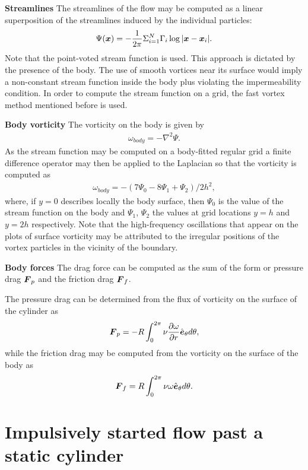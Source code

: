 {\bf Streamlines}
The streamlines of the flow may be computed as a linear superposition of the streamlines induced by the individual particles:
\begin{align}
\Psi (\boldsymbol{x}) = -\frac{1}{2\pi} \Sigma^{N}_{i=1} \Gamma_i \log |\boldsymbol{x} - \boldsymbol{x}_i|.
\end{align}
Note that the point-voted stream function is used. This approach is dictated by the presence of the body.
The use of smooth vortices near its surface would imply a non-constant stream function inside the body plus violating the impermeability condition.
In order to compute the stream function on a grid, the fast vortex method mentioned before is used.

{\bf Body vorticity}
The vorticity on the body is given by
\begin{align}
\omega_{body} = -\nabla^2 \Psi.
\end{align}
As the stream function may be computed on a body-fitted regular grid a finite difference operator may then be applied to the Laplacian so that the vorticity is computed as
\begin{align}
\omega_{body} = - (7\Psi_0 - 8\Psi_1 + \Psi_2) / 2h^2,
\end{align}
where, if $y = 0$ describes locally the body surface, then $\Psi_0$ is the value of the stream function on the body and $\Psi_1$, $\Psi_2$ the values at grid locations $y = h$ and $y = 2h$ respectively.
Note that the high-frequency oscillations that appear on the plots of surface vorticity may be attributed to the irregular positions of the vortex particles in the vicinity of the boundary.

{\bf Body forces}
The drag force can be computed as the sum of the form or pressure drag $\boldsymbol{F}_p$ and the friction drag $\boldsymbol{F}_f$.

The pressure drag can be determined from the flux of vorticity on the surface of the cylinder as
\begin{align}
\boldsymbol{F}_p = -R \int_0^{2\pi} \nu \frac{\partial \omega}{\partial r} \hat{\boldsymbol{e}}_{\theta} d\theta,
\end{align}
while the friction drag may be computed from the vorticity on the surface of the body as
\begin{align}
\boldsymbol{F}_f = R \int_0^{2\pi} \nu \omega \hat{\boldsymbol{e}}_{\theta} d\theta.
\end{align}


\section{Impulsively started flow past a static cylinder}

